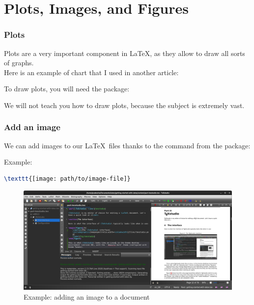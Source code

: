 
\part{Plots, Images, and Figures}


\section{Plots} \label{plots}

Plots are a very important component in \LaTeX, as they allow to draw all sorts of graphs. \\

Here is an example of chart that I used in another article:




\bigskip

To draw plots, you will need the  package:



We will not teach you how to draw plots, because the subject is extremely vast. \\



\section{Add an image}

We can add images to our \LaTeX\ files thanks to the  command from the  package:



Example:
\begin{lstlisting}[language=tex]
\texttt{[image: path/to/image-file]}
\end{lstlisting}


\begin{figure}[h]
	\caption{Example: adding an image to a document}
	\includegraphics[keepaspectratio,width=\columnwidth]{files/texstudio.png}
\end{figure}


